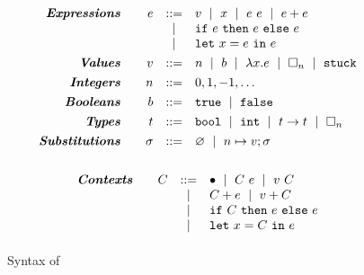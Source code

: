 \begin{figure}
$$
\begin{array}{rrcl}
\emphbf{Expressions} \quad
  & e & ::=    & v \spmid x \spmid \eapp{e}{e} \spmid \eplus{e}{e}\\
  &   & \spmid & \eif{e}{e}{e} \\
  &   & \spmid & \elet{x}{e}{e} \\[0.05in]

\emphbf{Values} \quad
  & v & ::= &  n \spmid b \spmid \efun{x}{e} \spmid \ehole{n} \spmid \stuck \\[0.05in]

\emphbf{Integers} \quad
  & n & ::= &  0,1,-1,\ldots \\[0.05in]

\emphbf{Booleans} \quad
  & b & ::= &  \etrue \spmid \efalse \\[0.05in]

\emphbf{Types} \quad
  & t & ::= & \tbool \spmid \tint \spmid \tfun{t}{t} \spmid \thole{n} \\[0.05in]

\emphbf{Substitutions} \quad
  & \vsu & ::= & \emptysu \spmid \mksub{n}{v}; \vsu \\[0.1in]
\end{array}
$$

$$
\begin{array}{rrcl}
\textbf{\emph{Contexts}} \quad
  & C
  & ::=
  &   	 \bullet
  \ \mid \  C \ e
  \ \mid \  v \ C \\
  & & \ \mid \  & C + e \ \mid \  v + C \\
  & & \ \mid \  & \mathtt{if}\ C\ \mathtt{then}\ e\ \mathtt{else}\ e \\
  & & \ \mid \  & \mathtt{let}\ x = C\ \mathtt{in}\ e
  \\[0.05in]
\end{array}
$$



\caption{Syntax of \lang {}}
\label{fig:syntax}
\end{figure}
